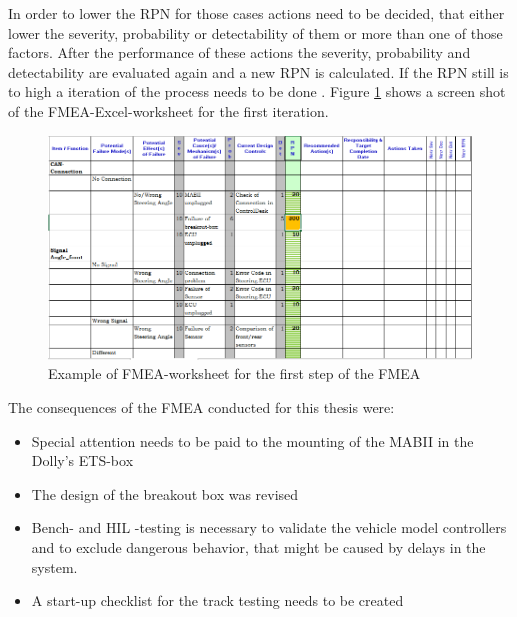 \documentclass[ExampleMasters.tex]{subfiles}
\begin{document}
In order to lower the \gls{RPN} for those cases actions need to be decided, that either lower the severity, probability or detectability of them or more than one of those factors. After the performance of these actions the severity, probability and detectability are evaluated again and a new \gls{RPN} is calculated. If the \gls{RPN} still is to high a iteration of the process needs to be done \cite{din_60812_fmea}.
Figure \ref{fig:fmea_example} shows a screen shot of the FMEA-Excel-worksheet for the first iteration.    
\begin{figure}[!htb]
	\centering
	\includegraphics[width=1.0\linewidth]{figures/fmea_example}
	\caption{Example of \gls{FMEA}-worksheet for the first step of the FMEA}
	\label{fig:fmea_example}
\end{figure}
The consequences of the \gls{FMEA} conducted for this thesis were:
\begin{itemize}
	\item Special attention needs to be paid to the mounting of the \gls{MABII} in the Dolly's \gls{ETS}-box
	\item The design of the breakout box was revised
	\item Bench- and \gls{HIL} -testing is necessary to validate  the vehicle model controllers and to exclude dangerous behavior, that might be caused by delays in the system. 
	\item A start-up checklist for the track testing needs to be created	 
\end{itemize}  
\end{document}
